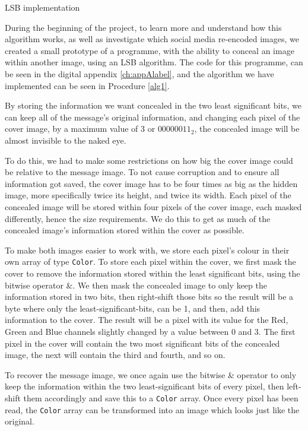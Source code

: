 \begin{experiment}{LSB implementation}

\label{sec:lsb-implementation}
During the beginning of the project, to learn more and understand how this algorithm works, as well as investigate which social media re-encoded images, we created a small prototype of a programme, with the ability to conceal an image within another image, using an LSB algorithm.
The code for this programme, can be seen in the digital appendix \ref{ch:appAlabel}, and the algorithm we have implemented can be seen in Procedure \ref{alg1}.

By storing the information we want concealed in the two least significant bits, we can keep all of the message's original information, and changing each pixel of the cover image, by a maximum value of 3 or $00000011_2$, the concealed image will be almost invisible to the naked eye.

To do this, we had to make some restrictions on how big the cover image could be relative to the message image. 
To not cause corruption and to ensure all information got saved, the cover image has to be four times as big as the hidden image, more specifically twice its height, and twice its width. 
Each pixel of the concealed image will be stored within four pixels of the cover image, each masked differently, hence the size requirements. 
We do this to get as much of the concealed image's information stored within the cover as possible.

To make both images easier to work with, we store each pixel's colour in their own array of type \lstinline|Color|.
To store each pixel within the cover, we first mask the cover to remove the information stored within the least significant bits, using the bitwise operator \&.
We then mask the concealed image to only keep the information stored in two bits, then right-shift those bits so the result will be a byte where only the least-significant-bits, can be 1, and then, add this information to the cover. 
The result will be a pixel with its value for the Red, Green and Blue channels slightly changed by a value between 0 and 3.
The first pixel in the cover will contain the two most significant bits of the concealed image, the next will contain the third and fourth, and so on. 

To recover the message image, we once again use the bitwise \& operator to only keep the information within the two least-significant bits of every pixel, then left-shift them accordingly and save this to a \lstinline|Color| array. Once every pixel has been read, the \lstinline|Color| array can be transformed into an image which looks just like the original.


\end{experiment}
